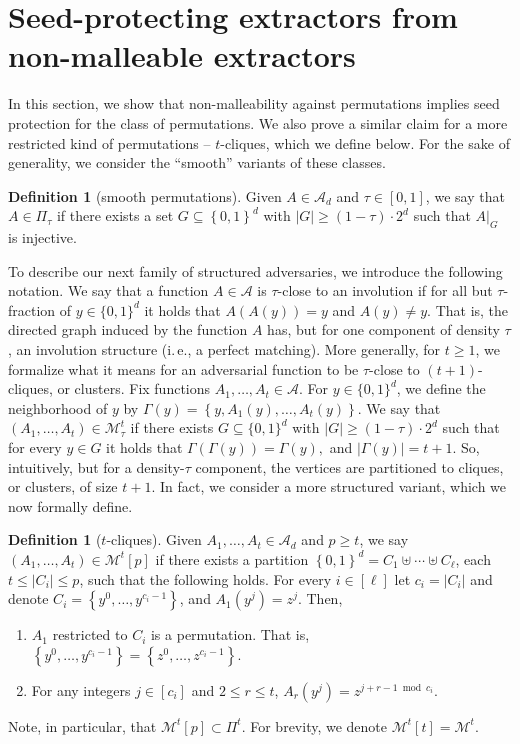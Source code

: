 \documentclass[11pt]{article}
\numberwithin{equation}{section}
\theoremstyle{definition}
\newtheorem{definition}[theorem]{Definition}
\theoremstyle{plain}
\newcommand{\ie}{i.\,e.}
\newcommand{\advfam}{\mathcal{A}}
\newcommand{\set}[1]{\left\{{#1}\right\}}
\newcommand{\B}{\set{0,1}}
\newcommand{\abs}[1]{\left\lvert #1\right\rvert}
\def\MM{{\mathcal{M}}}
\begin{document}
%
\section{Seed-protecting   %
extractors from non-malleable extractors}

In this section, we show that non-malleability against permutations
implies seed protection for the class of permutations. We also prove a similar claim for a more
restricted kind of permutations -- $t$-cliques, which we define below. For the sake of generality, we consider the ``smooth'' variants of these classes.

\begin{definition}[smooth permutations]\label{def:smooth2}
Given $A \in \mathcal{A}_d$ and $\tau \in [0,1]$, we say that $A \in \Pi_\tau$ if there exists a set $G \subseteq \B^d$ 
with $|G| \ge (1-\tau) \cdot 2^d$ such that $A|_G$ is injective.
\end{definition}

To describe our next family of structured adversaries, we introduce the following notation. We say that a function $A \in \advfam$ is $\tau$-close to an involution if for all but $\tau$-fraction of $y \in \{0,1\}^d$ it holds that $A(A(y)) = y$ and $A(y) \neq y$. That is, the directed graph induced by the function $A$ has, but for one component of density $\tau$, an involution structure (\ie, a perfect matching). More generally, for $t \ge 1$, we formalize what it means for an adversarial function to be $\tau$-close to  $(t+1)$-cliques, or clusters. Fix functions $A_1,\ldots,A_t \in \advfam$. For $y\in \{0,1\}^d$, we define the neighborhood of $y$ by
	$
	\Gamma(y) = \left\{y,A_1(y),\ldots, A_t(y)\right\}.
	$	
	We say that $(A_1,\ldots,A_t) \in \MM_\tau^t$ if there exists $G \subseteq \{0,1\}^d$ with $\abs{G} \geq (1-\tau)\cdot2^d$ such that for every $y \in G$ it holds that
	$
	\Gamma(\Gamma(y)) = \Gamma(y),
	$
	and $|\Gamma(y)| = t+1$. So, intuitively, but for a density-$\tau$ component, the vertices are partitioned to cliques, or clusters, of size $t+1$. In fact, we consider a more structured variant, which we now formally define.


\begin{definition}[$t$-cliques]\label{def:cliques}
Given $A_1,\ldots,A_t \in \mathcal{A}_d$ and $p \ge t$, we say
$\left(A_1,\ldots,A_t \right) \in \mathcal{M}^{t}[p]$ if there exists a
partition $\B^d = C_1 \uplus \cdots \uplus C_\ell$, each $t \le |C_i| \le p$, such that
the following holds. For every $i \in [\ell]$ let $c_i = |C_i|$ and denote $C_i = \set{y^{0},\ldots,y^{c_i-1}}$, and $A_{1}\left(y^{j}\right) = z^{j}$. Then,
\begin{enumerate}
    \item $A_1$ restricted to $C_i$ is a permutation. That is, $\set{y^{0},\ldots,y^{c_i-1}} = \set{z^{0},\ldots,z^{c_i-1}}$. 
    \item For any integers $j \in [c_i]$ and $2 \le r \le t$, $A_{r}\left( y^j \right) = z^{j+ r-1 \bmod c_i}$.
\end{enumerate}
Note, in particular, that $\mathcal{M}^t[p] \subset \Pi^t$. For brevity, we denote $\MM^t[t] = \MM^t$.
\end{definition}
\end{document}
